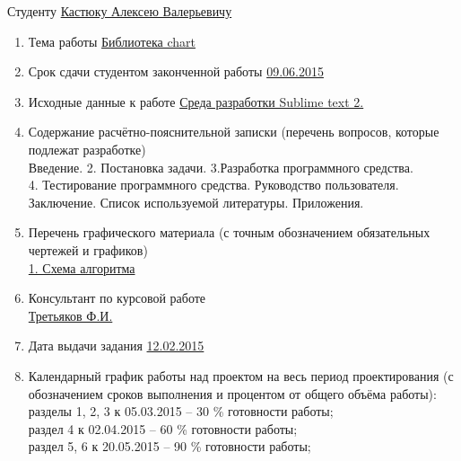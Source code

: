 \documentclass[a4paper,14pt]{extreport}
\begin{document}
	\medskip
	\endcenter
	\raggedright
	Студенту \underline{Кастюку Алексею Валерьевичу}\\
	\begin{enumerate}
	\item Тема работы \underline{Библиотека chart}\\ 
	\item Срок сдачи студентом законченной работы \underline{09.06.2015}
	\item Исходные данные к работе \underline{Среда разработки Sublime text 2. }
	\item Содержание расчётно-пояснительной записки (перечень вопросов, которые подлежат разработке)\\
	\underline{\hspace*{16cm}}\hspace*{-16cm}Введение. 2. Постановка задачи. 3.Разработка программного средства.\\
	\underline{\hspace*{16cm}}\hspace*{-16cm}4. Тестирование программного средства. Руководство пользователя.\\
	\underline{\hspace*{16cm}}\hspace*{-16cm} Заключение. Список используемой литературы. Приложения.\\
	\item Перечень графического материала (с точным обозначением обязательных чертежей и графиков)\\
	\underline{1. Схема алгоритма}
	\item Консультант по курсовой работе\\
	\underline{Третьяков Ф.И.}  
	\item Дата выдачи задания \underline{12.02.2015}
	\item Календарный график работы над проектом на весь период проектирования (с обозначением сроков выполнения и процентом от общего объёма работы):\\ 
	\underline{\hspace*{16cm}}\hspace*{-16cm}разделы 1, 2, 3 к 05.03.2015 – 30 \% готовности работы;\\ 
	\underline{\hspace*{16cm}}\hspace*{-16cm}раздел 4 к 02.04.2015 – 60 \% готовности работы;\\
	\underline{\hspace*{16cm}}\hspace*{-16cm}раздел 5, 6 к 20.05.2015  –  90 \% готовности работы;\\

\end{enumerate}
\end{document}
